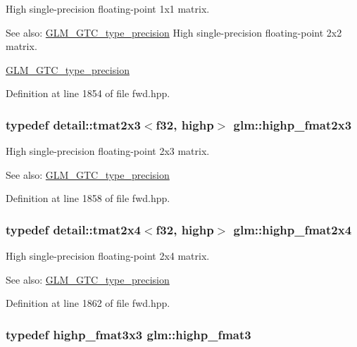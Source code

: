 High single-precision floating-point 1x1 matrix. \begin{Desc}
\item[See also:]\hyperlink{group__gtc__type__precision}{GLM\_\-GTC\_\-type\_\-precision} High single-precision floating-point 2x2 matrix. 

\hyperlink{group__gtc__type__precision}{GLM\_\-GTC\_\-type\_\-precision} \end{Desc}


Definition at line 1854 of file fwd.hpp.\hypertarget{group__gtc__type__precision_g53c126d1650b460bc7496a6fd5e5e764}{
\subsubsection[highp\_\-fmat2x3]{\setlength{\rightskip}{0pt plus 5cm}typedef detail::tmat2x3$<$f32, highp$>$ {\bf glm::highp\_\-fmat2x3}}}
\label{group__gtc__type__precision_g53c126d1650b460bc7496a6fd5e5e764}


High single-precision floating-point 2x3 matrix. \begin{Desc}
\item[See also:]\hyperlink{group__gtc__type__precision}{GLM\_\-GTC\_\-type\_\-precision} \end{Desc}


Definition at line 1858 of file fwd.hpp.\hypertarget{group__gtc__type__precision_g5df8430c47272adc901ef224d85a9c4d}{
\subsubsection[highp\_\-fmat2x4]{\setlength{\rightskip}{0pt plus 5cm}typedef detail::tmat2x4$<$f32, highp$>$ {\bf glm::highp\_\-fmat2x4}}}
\label{group__gtc__type__precision_g5df8430c47272adc901ef224d85a9c4d}


High single-precision floating-point 2x4 matrix. \begin{Desc}
\item[See also:]\hyperlink{group__gtc__type__precision}{GLM\_\-GTC\_\-type\_\-precision} \end{Desc}


Definition at line 1862 of file fwd.hpp.\hypertarget{group__gtc__type__precision_g3ff9af2eba26aa6df92aa73e1083e81e}{
\subsubsection[highp\_\-fmat3]{\setlength{\rightskip}{0pt plus 5cm}typedef highp\_\-fmat3x3 {\bf glm::highp\_\-fmat3}}}
\label{group__gtc__type__precision_g3ff9af2eba26aa6df92aa73e1083e81e}


